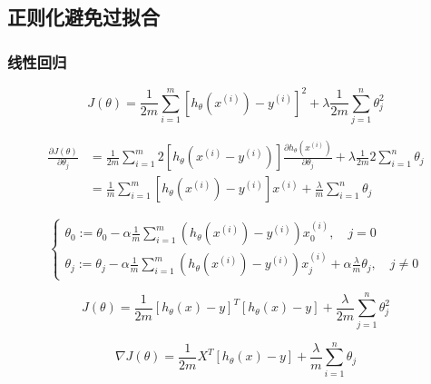 \subsection{正则化避免过拟合}
\subsubsection{线性回归}

\begin{equation}
	J(\theta) = \frac{1}{2m}\sum_{i=1}^m [h_\theta(x^{(i)})-y^{(i)}]^2 + \lambda \frac{1}{2m} \sum_{j=1}^n\theta_j^2
\end{equation}

\begin{equation}\begin{aligned}
	\frac{\partial{J(\theta)}}{\partial{\theta_j}} &= \frac{1}{2m}\sum_{i=1}^m 2[h_\theta(x^{(i)}-y^{(i)})] \frac{\partial{h_\theta(x^{(i)})}}{\partial{\theta_j}} + \lambda \frac{1}{2m} 2 \sum_{i=1}^n \theta_j \\
	    &= \frac{1}{m}\sum_{i=1}^m[h_\theta(x^{(i)})-y^{(i)}]x^{(i)} + \frac{\lambda}{m}\sum_{i=1}^n \theta_j
\end{aligned}\end{equation}

\[\begin{cases}
	\theta_0 := \theta_0 - \alpha \frac{1}{m} \sum_{i=1}^m(h_\theta(x^{(i)}) - y^{(i)})x_0^{(i)}, \quad j=0 \\
	\theta_j := \theta_j - \alpha \frac{1}{m} \sum_{i=1}^m(h_\theta(x^{(i)}) - y^{(i)})x_j^{(i)} + \alpha\frac{\lambda}{m}\theta_j, \quad j \neq 0
\end{cases}\]



\begin{equation}
	J(\theta) = \frac{1}{2m} \left[h_\theta(x) - y\right]^T \left[ h_\theta(x) - y\right] + \frac{\lambda}{2m} \sum_{j=1}^n\theta_j^2
\end{equation}

\begin{equation}
	\nabla J(\theta) = \frac{1}{2m} X^T \left[h_\theta(x) - y\right] + \frac{\lambda}{m}\sum_{i=1}^n \theta_j
\end{equation}


